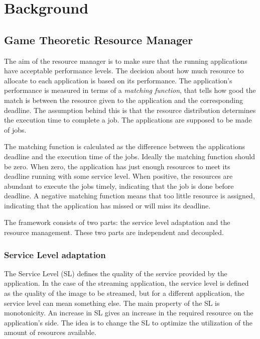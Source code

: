 \documentclass[nobiblatex]{LTHthesis}
\begin{document}
\chapter{Background}
\label{chp:background}

\section{Game Theoretic Resource Manager}

The aim of the resource manager is to make sure that the running applications
have acceptable performance levels. The decision about how much resource to
allocate to each application is based on its performance. The application's
performance is measured in terms of a \emph{matching function}, that tells how
good the match is between the resource given to the application and the
corresponding deadline. The assumption behind this is that the resource
distribution determines the execution time to complete a job. The applications
are supposed to be made of jobs. 

The matching function is calculated as the difference between the
applications deadline and the execution time of the jobs. Ideally the matching
function should be zero. When zero, the application has just enough resources
to meet its deadline running with some service level. When positive, the
resources are abundant to execute the jobs timely, indicating that the job
is done before deadline. A negative matching function means that too little
resource is assigned, indicating that the application has missed or will miss
its deadline.

The framework consists of two parts: the service level adaptation and the
resource management. These two parts are independent and decoupled.


\subsection{Service Level adaptation}

The Service Level (SL) defines the quality of the service provided by the 
application. In the case of the streaming application, the service level
is defined as the quality of the image to be streamed, but for a different
application, the service level can mean something else. The main property of
the SL is monotonicity. An increase in SL gives an increase in the required
resource on the application's side. The idea is to change the SL to optimize
the utilization of the amount of resources available. 
\end{document}
